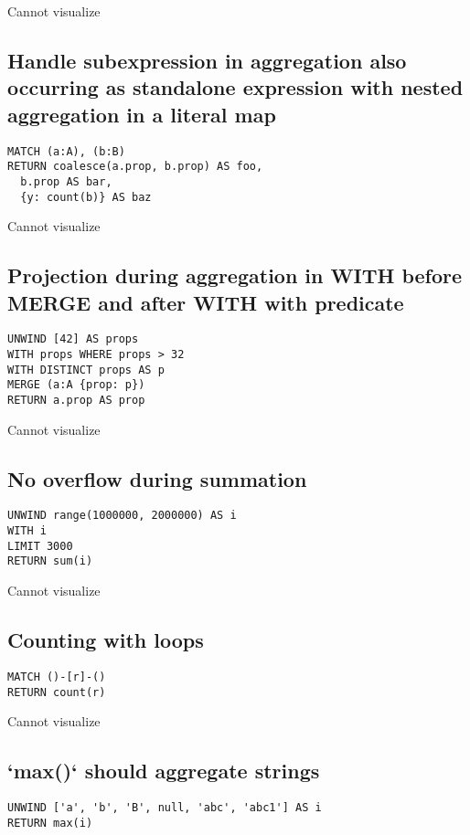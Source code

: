 Cannot visualize
\subsection{Handle subexpression in aggregation also occurring as standalone expression with nested aggregation in a literal map}

\begin{lstlisting}
MATCH (a:A), (b:B)
RETURN coalesce(a.prop, b.prop) AS foo,
  b.prop AS bar,
  {y: count(b)} AS baz
\end{lstlisting}

Cannot visualize
\subsection{Projection during aggregation in WITH before MERGE and after WITH with predicate}

\begin{lstlisting}
UNWIND [42] AS props
WITH props WHERE props > 32
WITH DISTINCT props AS p
MERGE (a:A {prop: p})
RETURN a.prop AS prop
\end{lstlisting}

Cannot visualize
\subsection{No overflow during summation}

\begin{lstlisting}
UNWIND range(1000000, 2000000) AS i
WITH i
LIMIT 3000
RETURN sum(i)
\end{lstlisting}

Cannot visualize
\subsection{Counting with loops}

\begin{lstlisting}
MATCH ()-[r]-()
RETURN count(r)
\end{lstlisting}

Cannot visualize
\subsection{`max()` should aggregate strings}

\begin{lstlisting}
UNWIND ['a', 'b', 'B', null, 'abc', 'abc1'] AS i
RETURN max(i)
\end{lstlisting}


